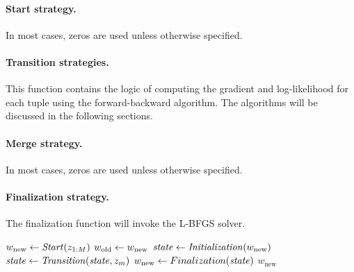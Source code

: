 \paragraph{Start strategy.}
In most cases, zeros are used unless otherwise specified.

\paragraph{Transition strategies.}
This function contains the logic of computing the gradient and log-likelihood for each tuple using the forward-backward
algorithm. The algorithms will be discussed in the following sections.

\paragraph{Merge strategy.}
In most cases, zeros are used unless otherwise specified.

\paragraph{Finalization strategy.}
The finalization function will invoke the L-BFGS solver.\\

\begin{algorithm}[Finalization$(z_{1:M})$] \label{alg:CRF training}
\begin{algorithmic}[1]
	\State $w_\text{new} \leftarrow \mathit{Start}(z_{1:M})$
	\Repeat
        \State $w_\text{old} \leftarrow w_\text{new}$
        \State $\mathit{state} \leftarrow \mathit{Initialization}(w_\text{new})$
		 
			\State $\mathit{state} \leftarrow \mathit{Transition}(\mathit{state}, z_m)$
		\EndFor
		\State $w_\text{new} \leftarrow Finalization(\mathit{state})$
    \State \Return $w_\text{new}$
\end{algorithmic}
\end{algorithm}


